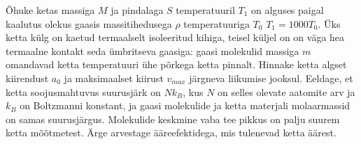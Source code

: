 \documentclass[a4paper,11pt,twocolumn]{article}
\begin{document}
\begin{question}[EuPhO 2017, T2]
	Õhuke ketas massiga \( M \) ja pindalaga \( S \) temperatuuril \( T_1 \) on alguses paigal kaalutus olekus gaasis massitihedusega \( \rho \) temperatuuriga \( T_0 \) \(T_1=1000T_0\). Üks ketta külg on kaetud termaalselt isoleeritud kihiga, teisel küljel on on väga hea termaalne kontakt seda ümbritseva gaasiga: gaasi molekulid massiga \( m \) omandavad ketta temperatuuri ühe põrkega ketta pinnalt. Hinnake ketta algset kiirendust \( a_0 \) ja maksimaalset kiirust \( v_{max} \) järgneva liikumise jooksul. Eeldage, et ketta soojusmahtuvus suurusjärk on \( Nk_B \), kus \( N \) on selles olevate aatomite arv ja \( k_B \) on Boltzmanni konstant, ja gaasi molekulide ja ketta materjali molaarmassid on samas suurusjärgus. Molekulide keskmine vaba tee pikkus on palju suurem ketta mõõtmetest. Ärge arvestage ääreefektidega, mis tulenevad ketta äärest.
\end{question}
\end{document}
